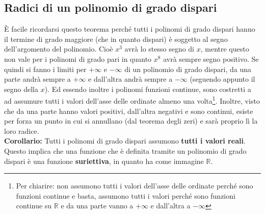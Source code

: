\subsection{Radici di un polinomio di grado dispari}

È facile ricordarsi questo teorema perché tutti i polinomi di grado dispari hanno il termine di grado maggiore (che in quanto dispari) è soggetto al segno dell'argomento del polinomio. Cioè $x^3$ avrà lo stesso segno di $x$, mentre questo non vale per i polinomi di grado pari in quanto $x^8$ avrà sempre segno positivo. Se quindi si fanno i limiti per $+\infty$ e $-\infty$ di un polinomio di grado dispari, da una parte andrà sempre a $+\infty$ e dall'altra andrà sempre a $-\infty$ (seguendo appunto il segno della $x$). Ed essendo inoltre i polinomi funzioni continue, sono costretti a ad assumure tutti i valori dell'asse delle ordinate almeno una volta\footnote{Per chiarire: non assumono tutti i valori dell'asse delle ordinate perché sono funzioni continue e basta, assumono tutti i valori perché sono funzioni continue su $\mathbb{R}$ e da una parte vanno a $+\infty$ e dall'altra a $-\infty$}. Inoltre, visto che da una parte hanno valori positivi, dall'altra negativi e sono continui, esiste per forza un punto in cui si annullano (dal teorema degli zeri) e sarà proprio lì la loro radice.\\

\textbf{Corollario:}
Tutti i polinomi di grado dispari assumono \textbf{tutti i valori reali}. Questo implica che una funzione che è definita tramite un polinomio di grado dispari è una funzione \textbf{suriettiva}, in quanto ha come immagine $\mathbb{R}$.

